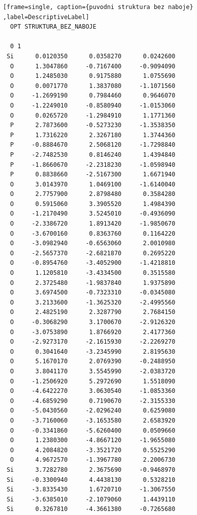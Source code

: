 \documentclass[
  digital, %
  table,   %
  lof,     %
  lot,     %
  oneside,
]{fithesis3}
\begin{document}
\begin{lstlisting}[frame=single, caption={struktura koordinace 5},label=DescriptiveLabel]
  \end{lstlisting}

  \begin{lstlisting}[frame=single, caption={puvodni struktura bez naboje} ,label=DescriptiveLabel]
  OPT STRUKTURA_BEZ_NABOJE

  0 1
 Si      0.0120350      0.0358270      0.0242600
  O      1.3047860     -0.7167400     -0.9094090
  O      1.2485030      0.9175880      1.0755690
  O      0.0071770      1.3837080     -1.1071560
  O     -1.2699190      0.7984460      0.9646070
  O     -1.2249010     -0.8580940     -1.0153060
  O      0.0265720     -1.2984910      1.1771360
  P      2.7873600     -0.5273230     -1.3538350
  P      1.7316220      2.3267180      1.3744360
  P     -0.8884670      2.5068120     -1.7298840
  P     -2.7482530      0.8146240      1.4394840
  P     -1.8660670     -2.2318230     -1.0598940
  P      0.8838660     -2.5167300      1.6671940
  O      3.0143970      1.0469100     -1.6140040
  O      2.7757900      2.8798480      0.3584280
  O      0.5915060      3.3905520      1.4984390
  O     -1.2170490      3.5245010     -0.4936090
  O     -2.3386720      1.8913420     -1.9850670
  O     -3.6700160      0.8363760      0.1164220
  O     -3.0982940     -0.6563060      2.0010980
  O     -2.5657370     -2.6821870      0.2695220
  O     -0.8954760     -3.4052900     -1.4218810
  O      1.1205810     -3.4334500      0.3515580
  O      2.3725480     -1.9837840      1.9375890
  O      3.6974500     -0.7323310     -0.0345080
  O      3.2133600     -1.3625320     -2.4995560
  O      2.4825190      2.3287790      2.7684150
  O     -0.3068290      3.1700670     -2.9126320
  O     -3.0753890      1.8766920      2.4177360
  O     -2.9273170     -2.1615930     -2.2269270
  O      0.3041640     -3.2345990      2.8195630
  O      5.1670170      2.0769390     -0.2488950
  O      3.8041170      3.5545990     -2.0383720
  O     -1.2506920      5.2972690      1.5518090
  O     -4.6422270      3.0630540     -1.0853360
  O     -4.6859290      0.7190670     -2.3155330
  O     -5.0430560     -2.0296240      0.6259080
  O     -3.7160060     -3.1653580      2.6583920
  O     -0.3341860     -5.6260400      0.0509660
  O      1.2380300     -4.8667120     -1.9655080
  O      4.2084820     -3.3521720      0.5525290
  O      4.9672570     -1.3967780      2.2006730
 Si      3.7282780      2.3675690     -0.9468970
 Si     -0.3300940      4.4438130      0.5328210
 Si     -3.8335430      1.6720710     -1.3067550
 Si     -3.6385010     -2.1079060      1.4439110
 Si      0.3267810     -4.3661380     -0.7265680

\end{lstlisting}
\end{document}
